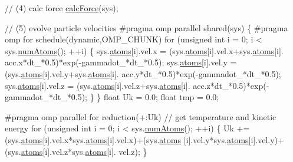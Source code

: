 \begin{DoxyCode}
    \textcolor{comment}{// (4) calc force}
    \hyperlink{classintegrator_ad630bf7c9b7339fa34f36fe43b0d9e3c}{calcForce}(sys);
    
    \textcolor{comment}{// (5) evolve particle velocities}
\textcolor{preprocessor}{    #pragma omp parallel shared(sys)}
\textcolor{preprocessor}{}    \{
\textcolor{preprocessor}{    #pragma omp for schedule(dynamic,OMP\_CHUNK)}
\textcolor{preprocessor}{}    \textcolor{keywordflow}{for} (\textcolor{keywordtype}{unsigned} \textcolor{keywordtype}{int} i = 0; i < sys.\hyperlink{classsystem_definition_ae8d3c2df2d56241cee03fcc4e2026ae0}{numAtoms}(); ++i) \{
        sys.\hyperlink{classsystem_definition_ae8814d3f60fc1111af2a3f218a4bfcab}{atoms}[i].vel.x = (sys.\hyperlink{classsystem_definition_ae8814d3f60fc1111af2a3f218a4bfcab}{atoms}[i].vel.x+sys.\hyperlink{classsystem_definition_ae8814d3f60fc1111af2a3f218a4bfcab}{atoms}[i].
      acc.x*dt\_*0.5)*exp(-gammadot\_*dt\_*0.5);
        sys.\hyperlink{classsystem_definition_ae8814d3f60fc1111af2a3f218a4bfcab}{atoms}[i].vel.y = (sys.\hyperlink{classsystem_definition_ae8814d3f60fc1111af2a3f218a4bfcab}{atoms}[i].vel.y+sys.\hyperlink{classsystem_definition_ae8814d3f60fc1111af2a3f218a4bfcab}{atoms}[i].
      acc.y*dt\_*0.5)*exp(-gammadot\_*dt\_*0.5);
        sys.\hyperlink{classsystem_definition_ae8814d3f60fc1111af2a3f218a4bfcab}{atoms}[i].vel.z = (sys.\hyperlink{classsystem_definition_ae8814d3f60fc1111af2a3f218a4bfcab}{atoms}[i].vel.z+sys.\hyperlink{classsystem_definition_ae8814d3f60fc1111af2a3f218a4bfcab}{atoms}[i].
      acc.z*dt\_*0.5)*exp(-gammadot\_*dt\_*0.5);
        \}
    \}
    \textcolor{keywordtype}{float} Uk = 0.0;
    \textcolor{keywordtype}{float} tmp = 0.0;

\textcolor{preprocessor}{    #pragma omp parallel for reduction(+:Uk)}
\textcolor{preprocessor}{}    \textcolor{comment}{// get temperature and kinetic energy}
    \textcolor{keywordflow}{for} (\textcolor{keywordtype}{unsigned} \textcolor{keywordtype}{int} i = 0; i < sys.\hyperlink{classsystem_definition_ae8d3c2df2d56241cee03fcc4e2026ae0}{numAtoms}(); ++i) \{
        Uk += (sys.\hyperlink{classsystem_definition_ae8814d3f60fc1111af2a3f218a4bfcab}{atoms}[i].vel.x*sys.\hyperlink{classsystem_definition_ae8814d3f60fc1111af2a3f218a4bfcab}{atoms}[i].vel.x)+(sys.\hyperlink{classsystem_definition_ae8814d3f60fc1111af2a3f218a4bfcab}{atoms}
      [i].vel.y*sys.\hyperlink{classsystem_definition_ae8814d3f60fc1111af2a3f218a4bfcab}{atoms}[i].vel.y)+(sys.\hyperlink{classsystem_definition_ae8814d3f60fc1111af2a3f218a4bfcab}{atoms}[i].vel.z*sys.\hyperlink{classsystem_definition_ae8814d3f60fc1111af2a3f218a4bfcab}{atoms}[i].
      vel.z);
    \}
    

\end{DoxyCode}
